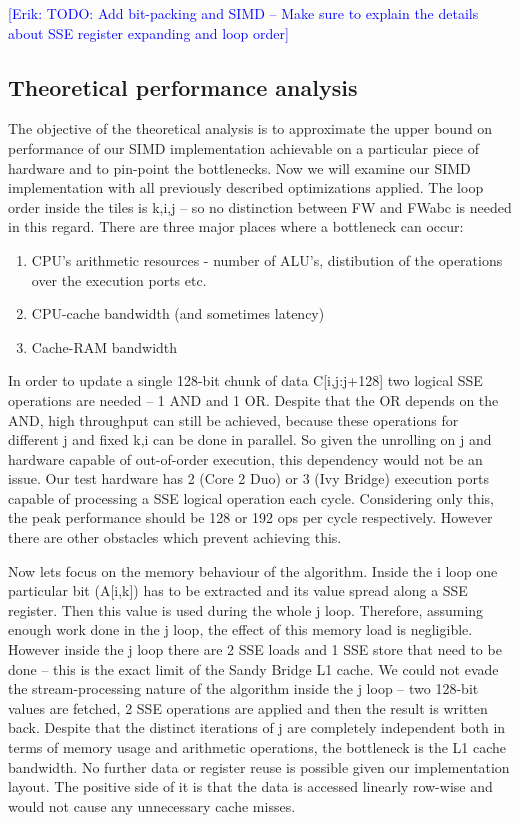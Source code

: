 \documentclass[letterpaper]{article}
\newcommand{\erik}[1]{\textcolor{blue}{[Erik: #1]}}
\begin{document}
\erik{TODO: Add bit-packing and SIMD -- Make sure to explain the details about SSE register expanding and loop order}

\subsection{Theoretical performance analysis}
The objective of the theoretical analysis is to approximate the upper bound on performance of our SIMD implementation
achievable on a particular piece of hardware and to pin-point the bottlenecks. Now we will examine our 
SIMD implementation with all previously described optimizations applied. 
The loop order inside the tiles is k,i,j -- so no distinction between FW and FWabc is needed in this regard. 
There are three major places where a bottleneck can occur:
\begin{enumerate}
\item CPU's arithmetic resources - number of ALU's, distibution of the operations over the execution ports etc. 
\item CPU-cache bandwidth (and sometimes latency)
\item Cache-RAM bandwidth
\end{enumerate}

In order to update a single 128-bit chunk of data C[i,j:j+128] two logical SSE operations are needed -- 1 AND and 1 OR. Despite that the OR depends on the AND, 
high throughput can still be achieved, because these operations for different j and fixed k,i can be done in parallel. So given the unrolling on j and hardware capable of
out-of-order execution, this dependency would not be an issue. Our test hardware has 2 (Core 2 Duo) or 3 (Ivy Bridge) execution ports capable of processing a SSE logical operation 
each cycle. Considering only this, the peak performance should be 128 or 192 ops per cycle respectively. However there are other obstacles which prevent achieving this. 

Now lets focus on the memory behaviour of the algorithm. Inside the i loop one particular bit (A[i,k]) has to be extracted and its value spread along a SSE register. Then this value is 
used during the whole j loop. Therefore, assuming enough work done in the j loop, the effect of this memory load is negligible. 
However inside the j loop there are 2 SSE loads and 1 SSE store that need to be done -- this is the exact limit of the Sandy Bridge L1 cache. 
We could not evade the stream-processing nature of the algorithm inside the j loop -- two 128-bit values are fetched, 2 SSE operations are applied and then the result is written back. 
Despite that the distinct iterations of j are completely independent both in terms of memory usage and arithmetic operations, the 
bottleneck is the L1 cache bandwidth. No further data or register reuse is possible given our implementation layout. The positive side of it is that the data is accessed 
linearly row-wise and would not cause any unnecessary cache misses. 
\end{document}
